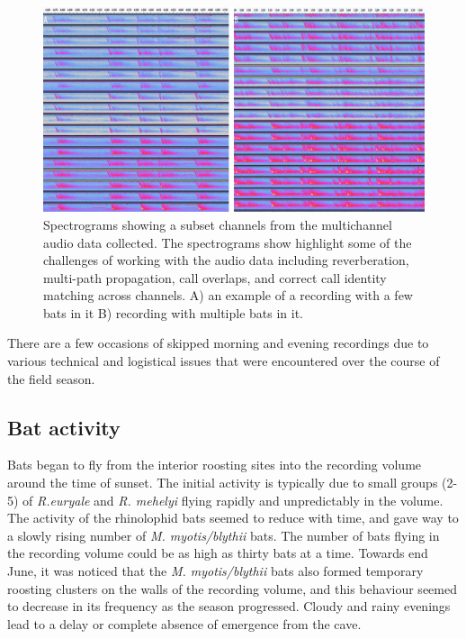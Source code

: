 \documentclass[
]{book}
\begin{document}
\begin{figure}
\includegraphics[width=1\linewidth,height=0.5\textheight]{original_papers/ushichka-figures/multichannel_composite_elongated} \caption{Spectrograms showing a subset channels from the multichannel audio data collected. The spectrograms show highlight some of the challenges of working with the audio data including reverberation, multi-path propagation, call overlaps, and correct call identity matching across channels. A) an example of a recording with a few bats in it B) recording with multiple bats in it.}\label{fig:multichannel-calls}
\end{figure}

There are a few occasions of skipped morning and evening recordings due to various technical and logistical issues that were encountered over the course of the field season.

\hypertarget{bat-activity}{%
\subsection{Bat activity}\label{bat-activity}}

Bats began to fly from the interior roosting sites into the recording volume around the time of sunset. The initial activity is typically due to small groups (2-5) of \emph{R.euryale} and \emph{R. mehelyi} flying rapidly and unpredictably in the volume. The activity of the rhinolophid bats seemed to reduce with time, and gave way to a slowly rising number of \emph{M. myotis/blythii} bats. The number of bats flying in the recording volume could be as high as thirty bats at a time. Towards end June, it was noticed that the \emph{M. myotis/blythii} bats also formed temporary roosting clusters on the walls of the recording volume, and this behaviour seemed to decrease in its frequency as the season progressed. Cloudy and rainy evenings lead to a delay or complete absence of emergence from the cave.
\end{document}
